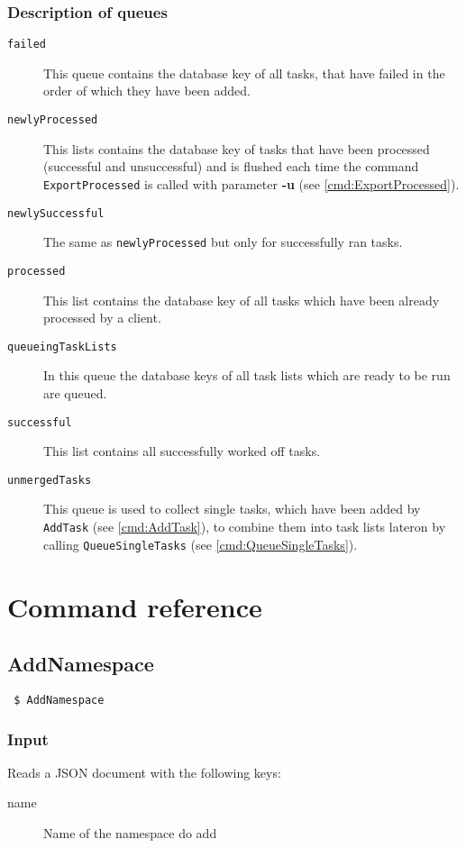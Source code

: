 \documentclass[a4paper,11pt]{article}
\begin{document}
\subsubsection{Description of queues}
\begin{description}
\item[\texttt{failed}] This queue contains the database key of all tasks, that have failed in the order of which they have been added.
\item[\texttt{newlyProcessed}] This lists contains the database key of tasks that have been processed (successful and unsuccessful) and is flushed each time the command \texttt{ExportProcessed} is called with parameter \textbf{-u} (see \ref{cmd:ExportProcessed}).
\item[\texttt{newlySuccessful}] The same as \texttt{newlyProcessed} but only for successfully ran tasks.
\item[\texttt{processed}] This list contains the database key of all tasks which have been already processed by a client.
\item[\texttt{queueingTaskLists}] In this queue the database keys of all task lists which are ready to be run are queued.
\item[\texttt{successful}] This list contains all successfully worked off tasks.
\item[\texttt{unmergedTasks}] This queue is used to collect single tasks, which have been added by \texttt{AddTask} (see \ref{cmd:AddTask}), to combine them into task lists lateron by calling \texttt{QueueSingleTasks} (see \ref{cmd:QueueSingleTasks}).
\end{description}


\newpage

\section{Command reference}

\subsection{AddNamespace}
\begin{verbatim}
 $ AddNamespace
\end{verbatim}

\subsubsection{Input}
Reads a JSON document with the following keys:
\begin{description}
\item[name] Name of the namespace do add
\end{description}
\end{document}
